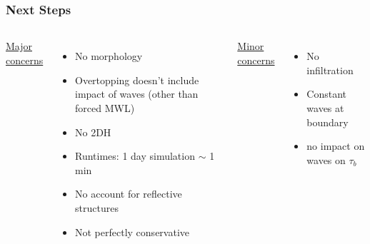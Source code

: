 \documentclass[aspectratio=169]{beamer}
\begin{document}
\begin{frame}
  \frametitle{Next Steps}
  \begin{columns}[c] %
    

    \underline{Major concerns}
    
    \begin{itemize}
    \item No morphology
    \item Overtopping doesn't include impact of waves (other than forced MWL)
    \item No 2DH
    \item Runtimes: 1 day simulation $\sim$ 1 min 
    \item No account for reflective structures
    \item Not perfectly conservative
    \end{itemize}
    
    \underline{Minor concerns}
    
    \begin{itemize}
    \item No infiltration
    \item Constant waves at boundary
    \item no impact on waves on $\tau_b$
    \end{itemize}
  \end{columns}
  
  
\end{frame}
\end{document}
